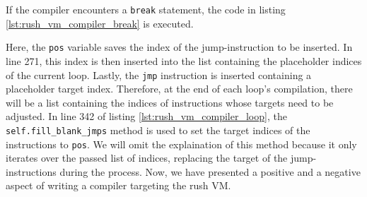 If the compiler encounters a \texttt{break} statement, the code in listing \ref{lst:rush_vm_compiler_break} is executed.


Here, the \texttt{pos} variable saves the index of the jump-instruction to be inserted.
In line 271, this index is then inserted into the list containing the placeholder indices of the current loop.
Lastly, the \texttt{jmp} instruction is inserted containing a placeholder target index.
Therefore, at the end of each loop's compilation, there will be a list containing the indices of instructions whose targets need to be adjusted.
In line 342 of listing \ref{lst:rush_vm_compiler_loop}, the \texttt{self.fill\_blank\_jmps} method is used to set the target indices of the instructions to \texttt{pos}.
We will omit the explaination of this method because it only iterates over the passed list of indices, replacing the target of the jump-instructions during the process.
Now, we have presented a positive and a negative aspect of writing a compiler targeting the rush VM.
